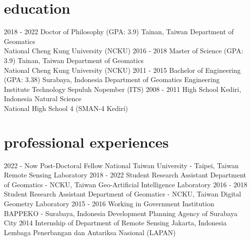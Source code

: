 \documentclass[icon]{mycvtemplate}
\begin{document}
\section{education}

\begin{TableTemplate}
  \TableTemplateItem
    {2018 - 2022}
    {Doctor of Philosophy (GPA: 3.9)}
    {Tainan, Taiwan}
    {Department of Geomatics\\ National Cheng Kung University (NCKU)}
  \TableTemplateItem
    {2016 - 2018}
    {Master of Science (GPA: 3.9)}
    {Tainan, Taiwan}
    {Department of Geomatics\\ National Cheng Kung University (NCKU)}
  \TableTemplateItem
    {2011 - 2015}
    {Bachelor of Engineering (GPA: 3.38)}
    {Surabaya, Indonesia}
    {Department of Geomatics Engineering\\ Institute Technology Sepuluh Nopember (ITS)}
  \TableTemplateItem
    {2008 - 2011}
    {High School}
    {Kediri, Indonesia}
    {Natural Science\\ National High School 4 (SMAN-4 Kediri)}
\end{TableTemplate}


\section{professional experiences}
\begin{TableTemplate}
  \TableTemplateItem
    {2022 - Now}
    {Post-Doctoral Fellow}
    {National Taiwan University - Taipei, Taiwan}
    {Remote Sensing Laboratory}
  \TableTemplateItem
    {2018 - 2022}
    {Student Research Assistant}
    {Department of Geomatics - NCKU, Taiwan}
    {Geo-Artificial Intelligence Laboratory}
  \TableTemplateItem
    {2016 - 2018}
    {Student Research Assistant}
    {Department of Geomatics - NCKU, Taiwan}
    {Digital Geometry Laboratory}
\TableTemplateItem
    {2015 - 2016}
    {Working in Government Institution}
    {BAPPEKO - Surabaya, Indonesia}
    {Development Planning Agency of Surabaya City}
\TableTemplateItem
    {2014}
    {Internship of Department of Remote Sensing}
    {Jakarta, Indonesia}
    {Lembaga Penerbangan dan Antariksa Nasional (LAPAN)}
\end{TableTemplate}
\end{document}
